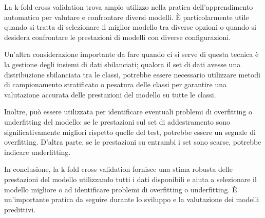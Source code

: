 La k-fold cross validation trova ampio utilizzo nella pratica dell'apprendimento automatico per valutare e confrontare diversi modelli. È particolarmente utile quando si tratta di selezionare il miglior modello tra diverse opzioni o quando si desidera confrontare le prestazioni di modelli con diverse configurazioni.

Un'altra considerazione importante da fare quando ci si serve di questa tecnica è la gestione degli insiemi di dati sbilanciati; qualora il set di dati avesse una distribuzione sbilanciata tra le classi, potrebbe essere necessario utilizzare metodi di campionamento stratificato o pesatura delle classi per garantire una valutazione accurata delle prestazioni del modello su tutte le classi.

Inoltre, può essere utilizzata per identificare eventuali problemi di overfitting o underfitting del modello: se le prestazioni sul set di addestramento sono significativamente migliori rispetto quelle del test, potrebbe essere un segnale di overfitting. D'altra parte, se le prestazioni su entrambi i set sono scarse, potrebbe indicare underfitting.

In conclusione, la k-fold cross validation fornisce una stima robusta delle prestazioni del modello utilizzando tutti i dati disponibili e aiuta a selezionare il modello migliore o ad identificare problemi di overfitting o underfitting. È un'importante pratica da seguire durante lo sviluppo e la valutazione dei modelli predittivi.


